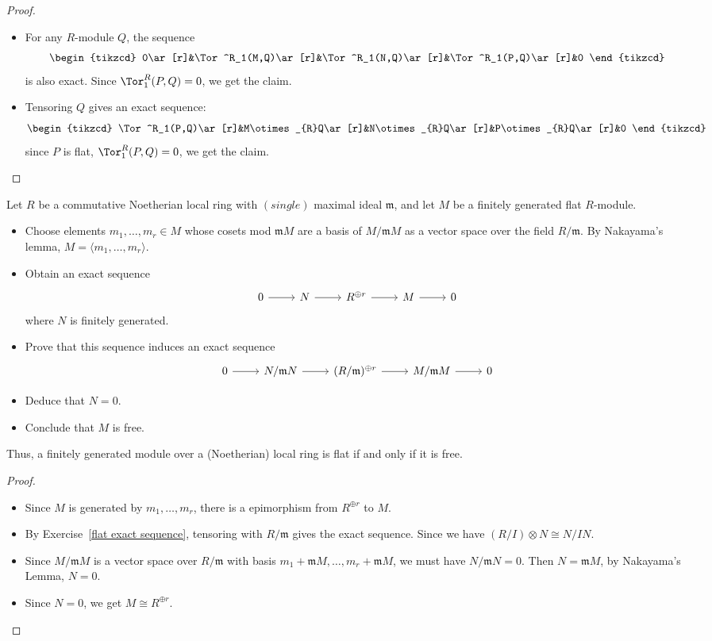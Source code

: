\begin{proof}
\mbox{}
\begin{itemize}
\item For any $R$-module $Q$, the sequence
\[\begin{tikzcd}
0\ar[r]&\Tor^R_1(M,Q)\ar[r]&\Tor^R_1(N,Q)\ar[r]&\Tor^R_1(P,Q)\ar[r]&0
\end{tikzcd}\]
is also exact. Since $\Tor^R_1(P,Q)=0$, we get the claim.
\item Tensoring $Q$ gives an exact sequence:
\[\begin{tikzcd}
\Tor^R_1(P,Q)\ar[r]&M\otimes_{R}Q\ar[r]&N\otimes_{R}Q\ar[r]&P\otimes_{R}Q\ar[r]&0
\end{tikzcd}\]
since $P$ is flat, $\Tor^R_1(P,Q)=0$, we get the claim.
\end{itemize}
\end{proof}
\begin{exercise}\label{local flat iff free}
Let $R$ be a commutative Noetherian local ring with $(single)$ maximal ideal $\mathfrak{m}$, and let $M$ be a finitely generated flat $R$-module.
\begin{itemize}
\item Choose elements $m_1,\dots,m_r\in M$ whose cosets mod $\mathfrak{m}M$ are a basis of $M/\mathfrak{m}M$ as a vector space over the field $R/\mathfrak{m}$. By Nakayama's lemma, $M=\langle m_1,\dots,m_r\rangle$.
\item Obtain an exact sequence
\[\begin{tikzcd}
0\ar[r]&N\ar[r]&R^{\oplus r}\ar[r]&M\ar[r]&0
\end{tikzcd}\]
where $N$ is finitely generated.
\item Prove that this sequence induces an exact sequence
\[\begin{tikzcd}
0\ar[r]&N/\mathfrak{m}N\ar[r]&(R/\mathfrak{m})^{\oplus r}\ar[r]&M/\mathfrak{m}M\ar[r]&0
\end{tikzcd}\]
\item Deduce that $N=0$.
\item Conclude that $M$ is free.
\end{itemize}
Thus, a finitely generated module over a (Noetherian) local ring is flat if and only if it is free.
\end{exercise}
\begin{proof}
\mbox{}
\begin{itemize}
\item Since $M$ is generated by $m_1,\dots,m_r$, there is a epimorphism from $R^{\oplus r}$ to $M$.
\item By Exercise~\ref{flat exact sequence}, tensoring with $R/\mathfrak{m}$ gives the exact sequence. Since we have $(R/I)\otimes N\cong N/IN$.
\item Since $M/\mathfrak{m}M$ is a vector space over $R/\mathfrak{m}$ with basis $m_1+\mathfrak{m}M,\dots,m_r+\mathfrak{m}M$, we must have $N/\mathfrak{m}N=0$. Then $N=\mathfrak{m}M$, by Nakayama's Lemma, $N=0$.
\item Since $N=0$, we get $M\cong R^{\oplus r}$.
\end{itemize}
\end{proof}

